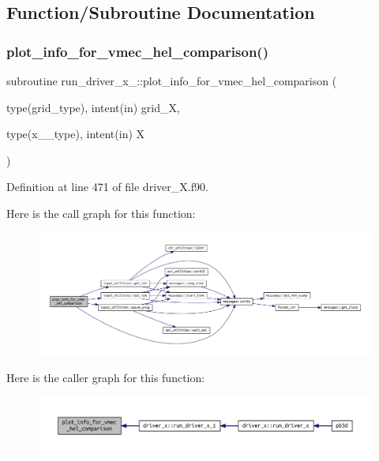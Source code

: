 \subsection{Function/\+Subroutine Documentation}
\mbox{\label{driver__X_8f90_ae1cbf887791dfb7f7ccf42abb9a8aed6}} 
\subsubsection{\texorpdfstring{plot\+\_\+info\+\_\+for\+\_\+vmec\+\_\+hel\+\_\+comparison()}{plot\_info\_for\_vmec\_hel\_comparison()}}
{\footnotesize\ttfamily subroutine run\+\_\+driver\+\_\+x\+\_\+::plot\+\_\+info\+\_\+for\+\_\+vmec\+\_\+hel\+\_\+comparison (\begin{DoxyParamCaption}\item[{type(grid\+\_\+type), intent(in)}]{grid\+\_\+X,  }\item[{type(x\+\_\+1\+\_\+type), intent(in)}]{X }\end{DoxyParamCaption})}



Definition at line 471 of file driver\+\_\+\+X.\+f90.

Here is the call graph for this function\+:
\nopagebreak
\begin{figure}[H]
\begin{center}
\leavevmode
\includegraphics[width=350pt]{driver__X_8f90_ae1cbf887791dfb7f7ccf42abb9a8aed6_cgraph}
\end{center}
\end{figure}
Here is the caller graph for this function\+:
\nopagebreak
\begin{figure}[H]
\begin{center}
\leavevmode
\includegraphics[width=350pt]{driver__X_8f90_ae1cbf887791dfb7f7ccf42abb9a8aed6_icgraph}
\end{center}
\end{figure}
